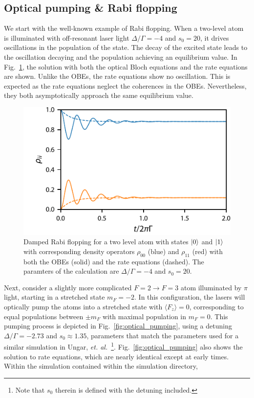 \documentclass[final,5p,times,twocolumn]{elsarticle}
\begin{document}
\subsection{Optical pumping \& Rabi flopping}
We start with the well-known example of Rabi flopping.  When a two-level atom is illuminated with off-resonant laser light $\Delta/\Gamma=-4$ and $s_0 = 20$, it drives oscillations in the population of the state.  The decay of the excited state leads to the oscillation decaying and the population achieving an equilibrium value.  In Fig.~\ref{fig:rabi_flopping}, the solution with both the optical Bloch equations and the rate equations are shown.  Unlike the OBEs, the rate equations show no oscillation.  This is expected as the rate equations neglect the coherences in the OBEs.  Nevertheless, they both asymptotically approach the same equilibrium value.

\begin{figure}
	\center
	\includegraphics{figs/damped_rabi_flopping.pdf}
	\caption{\label{fig:rabi_flopping} Damped Rabi flopping for a two level atom with states $\ket{0}$ and $\ket{1}$ with corresponding density operators $\rho_{00}$ (blue) and $\rho_{11}$ (red) with both the OBEs (solid) and the rate equations (dashed).  The paramters of the calculation are $\Delta/\Gamma=-4$ and $s_0=20$.}
\end{figure}

Next, consider a slightly more complicated $F=2\rightarrow F=3$ atom illuminated by $\pi$ light, starting in a stretched state $m_F=-2$.  In this configuration, the lasers will optically pump the atoms into a stretched state with $\langle F_z \rangle = 0$, corresponding to equal populations between $\pm m_F$ with maximal population in $m_F=0$.  This pumping process is depicted in Fig.~\ref{fig:optical_pumping}, using a detuning $\Delta/\Gamma = -2.73$ and $s_0\approx 1.35$, parameters that match the parameters used for a similar simulation in Ungar, {\it et. al.}~\cite{Ungar1989}\footnote{Note that $s_0$ therein is defined with the detuning included.}.  Fig.~\ref{fig:optical_pumping} also shows the solution to rate equations, which are nearly identical except at early times.  Within the simulation contained within the simulation directory, 
\end{document}
